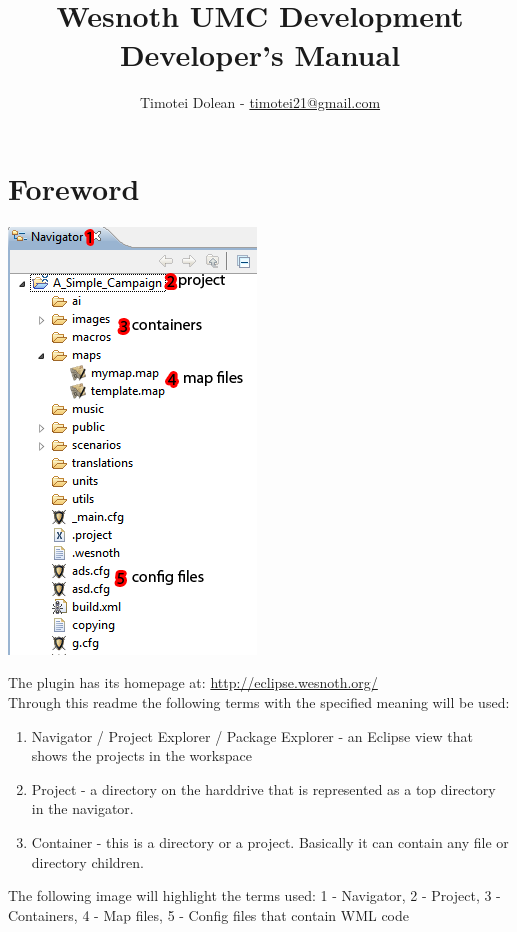 \documentclass[10pt]{article}
\title{Wesnoth UMC Development \\ Developer's Manual}
\author{Timotei Dolean - \href{mailto:timotei21@gmail.com}{timotei21@gmail.com}}
\begin{document}
\maketitle

\tableofcontents
\setcounter{tocdepth}{3}
\newpage

\newcommand{\icnt}{ \stepcounter{cnt} \thecnt }

\section{Foreword}
\begin{multicols}{2}
  \begin{center}
    \includegraphics[scale=0.6]{definitions.png}
  \end{center}

The plugin has its homepage at: \url{http://eclipse.wesnoth.org/} \\


Through this readme the following terms with the specified meaning will be used:
\begin{enumerate}
\item Navigator / Project Explorer / Package Explorer - an Eclipse view that shows the projects in the workspace
\item Project - a directory on the harddrive that is represented as a top directory in the navigator.
\item Container - this is a directory or a project. Basically it can contain any file or directory children.
\end{enumerate}

The following image will highlight the terms used: 1 - Navigator, 2 - Project, 3 - Containers, 4 - Map files, 5 - Config files that contain WML code
\end{multicols}
\end{document}
